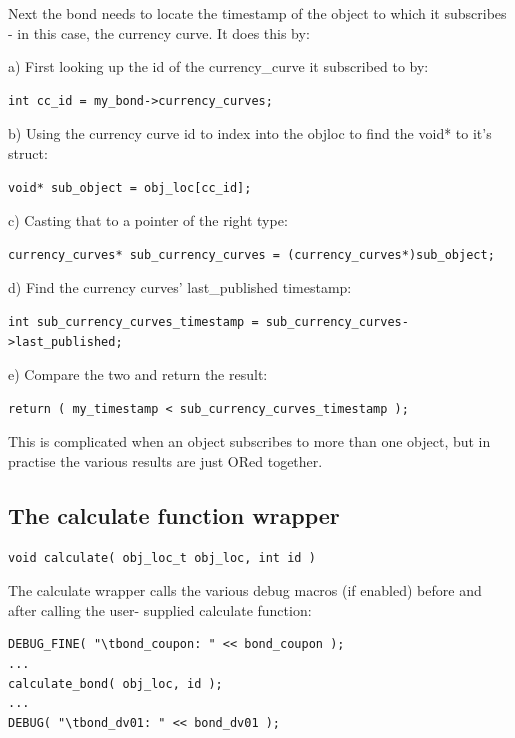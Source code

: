 \documentclass{report}
\begin{document}
Next the bond needs to locate the timestamp of the object to which it subscribes - in this case, the 
currency curve. It does this by:

a) First looking up the id of the currency_curve it subscribed to by:
\begin{verbatim}
int cc_id = my_bond->currency_curves;
\end{verbatim}

b) Using the currency curve id to index into the objloc to find the void* to it's struct:
\begin{verbatim}
void* sub_object = obj_loc[cc_id];
\end{verbatim}

c) Casting that to a pointer of the right type:
\begin{verbatim}
currency_curves* sub_currency_curves = (currency_curves*)sub_object;
\end{verbatim}

d) Find the currency curves' last_published timestamp:
    
\begin{verbatim}
int sub_currency_curves_timestamp = sub_currency_curves->last_published;
\end{verbatim}

e) Compare the two and return the result:
\begin{verbatim}
return ( my_timestamp < sub_currency_curves_timestamp );
\end{verbatim}

This is complicated when an object subscribes to more than one object, but in practise the various results are just ORed together. 

\subsection{The calculate function wrapper}

\begin{verbatim}
void calculate( obj_loc_t obj_loc, int id )
\end{verbatim}

The calculate wrapper calls the various debug macros (if enabled) before and after calling the user-
supplied calculate function:

\begin{verbatim}
DEBUG_FINE( "\tbond_coupon: " << bond_coupon );
...
calculate_bond( obj_loc, id );
...
DEBUG( "\tbond_dv01: " << bond_dv01 );
\end{verbatim}
\end{document}
